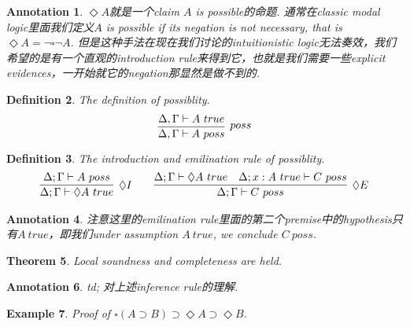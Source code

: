 \documentclass{article}
\theoremstyle{plain}
\newtheorem{theorem}{Theorem}
\newtheorem{example}[theorem]{Example}
\newtheorem{definition}[theorem]{Definition}
\newtheorem{annotation}[theorem]{Annotation}
\theoremstyle{nonumberplain}
\begin{document}
\begin{annotation}
\rm $\Diamond A$就是一个claim $A$ is possible的命题. 通常在classic modal logic里面我们定义$A$ is possible if its negation is not necessary, that is $\Diamond A = \neg \square \neg A$. 但是这种手法在现在我们讨论的intuitionistic logic无法奏效，我们希望的是有一个直观的introduction rule来得到它，也就是我们需要一些explicit evidences，一开始就它的negation那显然是做不到的. 
\end{annotation}

\begin{definition}
\rm \cite{15-816-ciom}The definition of possiblity.
$$
\infer[poss]{\Delta,\Gamma \vdash A~poss}{\Delta,\Gamma \vdash A~true}
$$
\end{definition}


\begin{definition}
\rm The introduction and emilination rule of possiblity.
$$
\begin{aligned}
\infer[\Diamond I]{\Delta;\Gamma \vdash \Diamond A~true}{\Delta;\Gamma \vdash A~poss} &&&&
\infer[\Diamond E]{\Delta;\Gamma \vdash C~poss}{\Delta;\Gamma \vdash \Diamond A~true & \Delta;x:A~true \vdash C~poss}
\end{aligned}
$$
\end{definition}

\begin{annotation}
\rm 注意这里的emilination rule里面的第二个premise中的hypothesis只有$A ~true$，即我们under assumption $A~true$, we conclude $C~poss$.
\end{annotation}

\begin{theorem}
\rm Local soundness and completeness are held. 
\end{theorem}

\begin{annotation}
\rm td; 对上述inference rule的理解. 
\end{annotation}

\begin{example}
\rm Proof of $\square(A \supset B) \supset \Diamond A \supset \Diamond B$.
\end{example}
\end{document}
